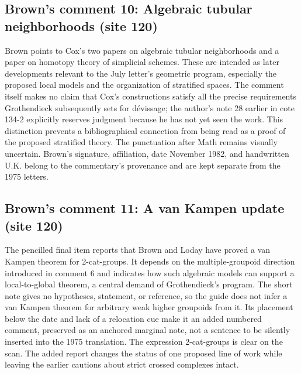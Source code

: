 \documentclass[10pt,oneside]{book}
\begin{document}
\subsection*{Brown's comment 10: Algebraic tubular neighborhoods (site 120)}
Brown points to Cox's two papers on algebraic tubular neighborhoods and a paper on homotopy theory of simplicial schemes. These are intended as later developments relevant to the July letter's geometric program, especially the proposed local models and the organization of stratified spaces. The comment itself makes no claim that Cox's constructions satisfy all the precise requirements Grothendieck subsequently sets for dévissage; the author's note 28 earlier in cote 134-2 explicitly reserves judgment because he has not yet seen the work. This distinction prevents a bibliographical connection from being read as a proof of the proposed stratified theory. The punctuation after Math remains visually uncertain. Brown's signature, affiliation, date November 1982, and handwritten U.K. belong to the commentary's provenance and are kept separate from the 1975 letters.

\subsection*{Brown's comment 11: A van Kampen update (site 120)}
The pencilled final item reports that Brown and Loday have proved a van Kampen theorem for 2-cat-groups. It depends on the multiple-groupoid direction introduced in comment 6 and indicates how such algebraic models can support a local-to-global theorem, a central demand of Grothendieck's program. The short note gives no hypotheses, statement, or reference, so the guide does not infer a van Kampen theorem for arbitrary weak higher groupoids from it. Its placement below the date and lack of a relocation cue make it an added numbered comment, preserved as an anchored marginal note, not a sentence to be silently inserted into the 1975 translation. The expression 2-cat-groups is clear on the scan. The added report changes the status of one proposed line of work while leaving the earlier cautions about strict crossed complexes intact.
\end{document}
